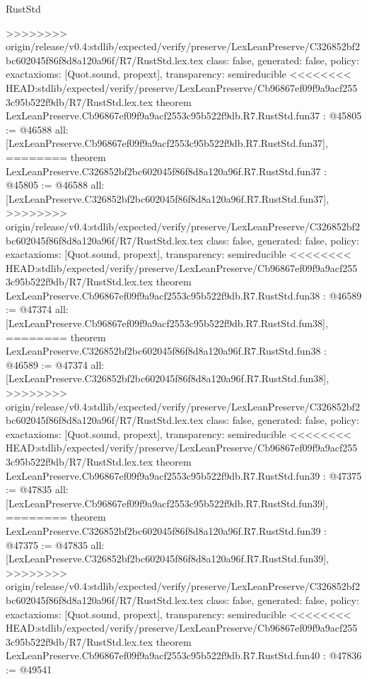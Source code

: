 \begin{lexlean}{RustStd}
\begin{coremodule}
{\begin{coremodule}
{{{{{{{{{{{{{{{{{{{{{{{{{{{{{{{{{{{{{{{{>>>>>>>> origin/release/v0.4:stdlib/expected/verify/preserve/LexLeanPreserve/C326852bf2bc602045f86f8d8a120a96f/R7/RustStd.lex.tex
  class: false,
  generated: false,
  policy: exact{axioms: [Quot.sound, propext]},
  transparency: semireducible
}
<<<<<<<< HEAD:stdlib/expected/verify/preserve/LexLeanPreserve/Cb96867ef09f9a9acf2553c95b522f9db/R7/RustStd.lex.tex
theorem LexLeanPreserve.Cb96867ef09f9a9acf2553c95b522f9db.R7.RustStd.fun37 : @45805 := @46588 {
  all: [LexLeanPreserve.Cb96867ef09f9a9acf2553c95b522f9db.R7.RustStd.fun37],
========
theorem LexLeanPreserve.C326852bf2bc602045f86f8d8a120a96f.R7.RustStd.fun37 : @45805 := @46588 {
  all: [LexLeanPreserve.C326852bf2bc602045f86f8d8a120a96f.R7.RustStd.fun37],
>>>>>>>> origin/release/v0.4:stdlib/expected/verify/preserve/LexLeanPreserve/C326852bf2bc602045f86f8d8a120a96f/R7/RustStd.lex.tex
  class: false,
  generated: false,
  policy: exact{axioms: [Quot.sound, propext]},
  transparency: semireducible
}
<<<<<<<< HEAD:stdlib/expected/verify/preserve/LexLeanPreserve/Cb96867ef09f9a9acf2553c95b522f9db/R7/RustStd.lex.tex
theorem LexLeanPreserve.Cb96867ef09f9a9acf2553c95b522f9db.R7.RustStd.fun38 : @46589 := @47374 {
  all: [LexLeanPreserve.Cb96867ef09f9a9acf2553c95b522f9db.R7.RustStd.fun38],
========
theorem LexLeanPreserve.C326852bf2bc602045f86f8d8a120a96f.R7.RustStd.fun38 : @46589 := @47374 {
  all: [LexLeanPreserve.C326852bf2bc602045f86f8d8a120a96f.R7.RustStd.fun38],
>>>>>>>> origin/release/v0.4:stdlib/expected/verify/preserve/LexLeanPreserve/C326852bf2bc602045f86f8d8a120a96f/R7/RustStd.lex.tex
  class: false,
  generated: false,
  policy: exact{axioms: [Quot.sound, propext]},
  transparency: semireducible
}
<<<<<<<< HEAD:stdlib/expected/verify/preserve/LexLeanPreserve/Cb96867ef09f9a9acf2553c95b522f9db/R7/RustStd.lex.tex
theorem LexLeanPreserve.Cb96867ef09f9a9acf2553c95b522f9db.R7.RustStd.fun39 : @47375 := @47835 {
  all: [LexLeanPreserve.Cb96867ef09f9a9acf2553c95b522f9db.R7.RustStd.fun39],
========
theorem LexLeanPreserve.C326852bf2bc602045f86f8d8a120a96f.R7.RustStd.fun39 : @47375 := @47835 {
  all: [LexLeanPreserve.C326852bf2bc602045f86f8d8a120a96f.R7.RustStd.fun39],
>>>>>>>> origin/release/v0.4:stdlib/expected/verify/preserve/LexLeanPreserve/C326852bf2bc602045f86f8d8a120a96f/R7/RustStd.lex.tex
  class: false,
  generated: false,
  policy: exact{axioms: [Quot.sound, propext]},
  transparency: semireducible
}
<<<<<<<< HEAD:stdlib/expected/verify/preserve/LexLeanPreserve/Cb96867ef09f9a9acf2553c95b522f9db/R7/RustStd.lex.tex
theorem LexLeanPreserve.Cb96867ef09f9a9acf2553c95b522f9db.R7.RustStd.fun40 : @47836 := @49541 {
}}}}}}}}}}}}}}}}}}}}}}}}}}}}}}}}}}}}}}}}}}}
\end{coremodule}}
\end{coremodule}
\end{lexlean}
